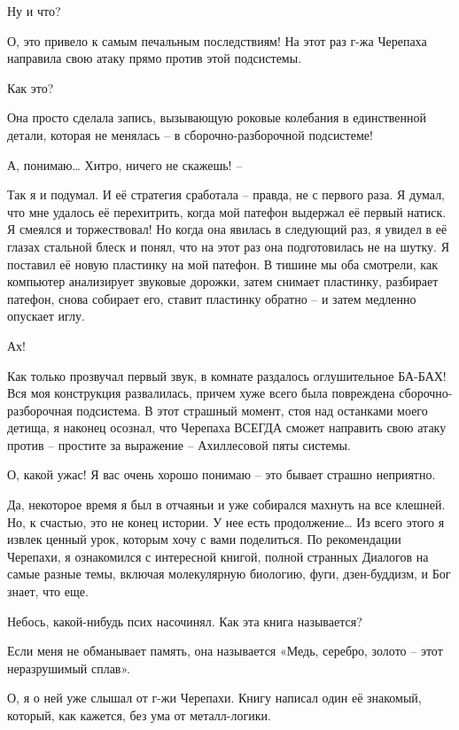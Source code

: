 \documentclass[../main.tex]{subfiles}
\begin{document}
\begin{dialogue}
 Ну и что?

 О, это привело к самым печальным последствиям! На этот раз г-жа Черепаха направила свою атаку прямо против этой подсистемы.

 Как это?

 Она просто сделала запись, вызывающую роковые колебания в единственной детали, которая не менялась \--- в сборочно-разборочной подсистеме!

 А, понимаю\ldots{} Хитро, ничего не скажешь! \---

 Так я и подумал. И её стратегия сработала \--- правда, не с первого раза. Я думал, что мне удалось её перехитрить, когда мой патефон выдержал её первый натиск. Я смеялся и торжествовал! Но когда она явилась в следующий раз, я увидел в её глазах стальной блеск и понял, что на этот раз она подготовилась не на шутку. Я поставил её новую пластинку на мой патефон. В тишине мы оба смотрели, как компьютер анализирует звуковые дорожки, затем снимает пластинку, разбирает патефон, снова собирает его, ставит пластинку обратно \--- и затем медленно опускает иглу.

 Ах!

 Как только прозвучал первый звук, в комнате раздалось оглушительное БА-БАХ! Вся моя конструкция развалилась, причем хуже всего была повреждена сборочно-разборочная подсистема. В этот страшный момент, стоя над останками моего детища, я наконец осознал, что Черепаха ВСЕГДА сможет направить свою атаку против \--- простите за выражение \--- Ахиллесовой пяты системы.

 О, какой ужас! Я вас очень хорошо понимаю \--- это бывает страшно неприятно.

 Да, некоторое время я был в отчаяньи и уже собирался махнуть на все клешней. Но, к счастью, это не конец истории. У нее есть продолжение\ldots{} Из всего этого я извлек ценный урок, которым хочу с вами поделиться. По рекомендации Черепахи, я ознакомился с интересной книгой, полной странных Диалогов на самые разные темы, включая молекулярную биологию, фуги, дзен-буддизм, и Бог знает, что еще.

 Небось, какой-нибудь псих насочинял. Как эта книга называется?

 Если меня не обманывает память, она называется «Медь, серебро, золото \--- этот неразрушимый сплав».

 О, я о ней уже слышал от г-жи Черепахи. Книгу написал один её знакомый, который, как кажется, без ума от металл-логики.


\end{dialogue}
\end{document}
